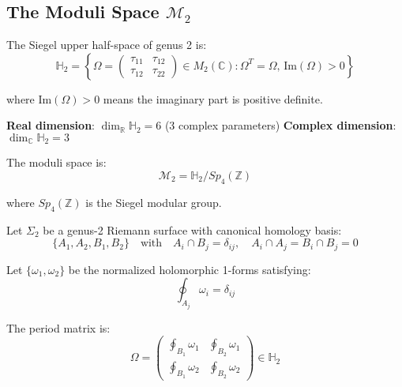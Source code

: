 \subsection{The Moduli Space $\mathcal{M}_2$}

\begin{definition}
\label{def:siegel-h2}
The Siegel upper half-space of genus 2 is:
\begin{equation}
\mathbb{H}_2 = \left\{\Omega = \begin{pmatrix} \tau_{11} & \tau_{12} \\ \tau_{12} & \tau_{22} \end{pmatrix} \in M_2(\mathbb{C}) : 
\Omega^T = \Omega, \, \text{Im}(\Omega) > 0\right\}
\end{equation}

where $\text{Im}(\Omega) > 0$ means the imaginary part is positive definite.

\textbf{Real dimension}: $\dim_{\mathbb{R}} \mathbb{H}_2 = 6$ (3 complex parameters)
\textbf{Complex dimension}: $\dim_{\mathbb{C}} \mathbb{H}_2 = 3$

The moduli space is:
\begin{equation}
\mathcal{M}_2 = \mathbb{H}_2 / Sp_4(\mathbb{Z})
\end{equation}

where $Sp_4(\mathbb{Z})$ is the Siegel modular group.
\end{definition}

\begin{definition}
\label{def:period-matrix-g2}
Let $\Sigma_2$ be a genus-2 Riemann surface with canonical homology basis:
\begin{equation}
\{A_1, A_2, B_1, B_2\} \quad \text{with} \quad A_i \cap B_j = \delta_{ij}, \quad A_i \cap A_j = B_i \cap B_j = 0
\end{equation}

Let $\{\omega_1, \omega_2\}$ be the normalized holomorphic 1-forms satisfying:
\begin{equation}
\oint_{A_j} \omega_i = \delta_{ij}
\end{equation}

The period matrix is:
\begin{equation}
\Omega = \begin{pmatrix} 
\oint_{B_1} \omega_1 & \oint_{B_2} \omega_1 \\
\oint_{B_1} \omega_2 & \oint_{B_2} \omega_2
\end{pmatrix}
\in \mathbb{H}_2
\end{equation}
\end{definition}


